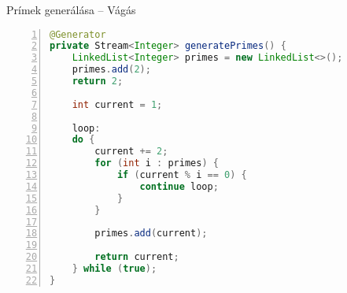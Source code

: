 \begin{frame}[fragile]{Prímek generálása -- Vágás}
\begin{center}
\begin{lstlisting}[language=java, xleftmargin=15pt,
        basicstyle=\fontsize{7}{9}\selectfont,
        numbers=left,
        numbersep=5pt, escapechar=!,
        linebackgroundcolor={
            \btLstHL<1>{30} % No highlighting
            \btLstHL<2>{5, 20}
            \btLstHL<3>{10, 21}
            \btLstHL<4>{14}
            \btLstHL<5>{12-16}
        }]
@Generator
private Stream<Integer> generatePrimes() {
    LinkedList<Integer> primes = new LinkedList<>();
    primes.add(2);
    return 2;

    int current = 1;

    loop:
    do {
        current += 2;
        for (int i : primes) {
            if (current % i == 0) {
                continue loop;
            }
        }

        primes.add(current);

        return current;
    } while (true);
}
\end{lstlisting}
\end{center}
\par
\end{frame}

